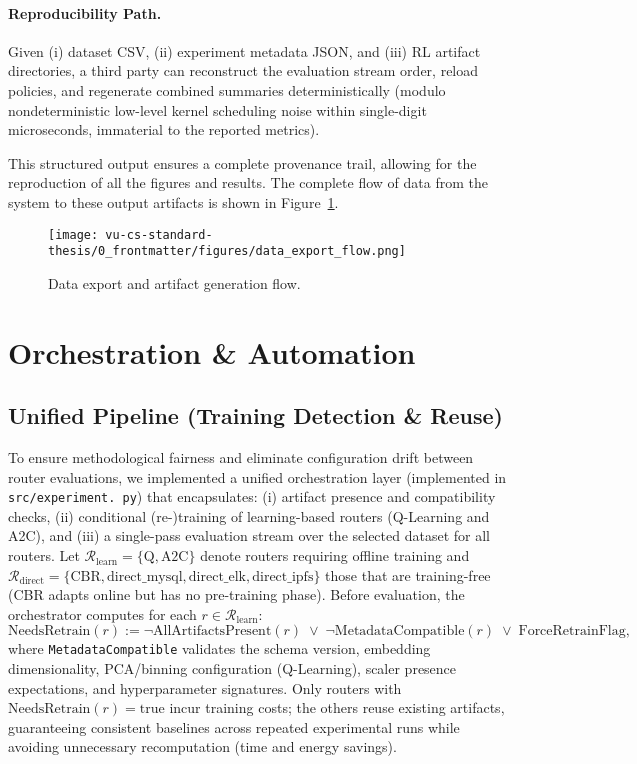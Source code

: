 \paragraph{Reproducibility Path.} Given (i) dataset CSV, (ii) experiment metadata JSON, and (iii) RL artifact directories, a third party can reconstruct the evaluation stream order, reload policies, and regenerate combined summaries deterministically (modulo nondeterministic low-level kernel scheduling noise within single-digit microseconds, immaterial to the reported metrics).

This structured output ensures a complete provenance trail, allowing for the 
reproduction of all the figures and results. The complete flow of data from the 
system to these output artifacts is shown in Figure~\ref{fig:export}.

\begin{figure}[htbp]
\centering
\texttt{[image: vu-cs-standard-thesis/0\_frontmatter/figures/data\_export\_flow.png]}
\caption{Data export and artifact generation flow.}
\label{fig:export}
\end{figure}



\section{Orchestration \& Automation}
\label{s:orchestration}

\subsection{Unified Pipeline (Training Detection \& Reuse)}
\label{s:orchestration-unified-pipeline}
To ensure methodological fairness and eliminate configuration drift between router evaluations, we implemented a unified orchestration layer (implemented in \texttt{src/experiment. py}) that encapsulates: (i) artifact presence  and compatibility checks, (ii) conditional (re-)training of learning-based routers (Q-Learning and A2C), and (iii) a single-pass evaluation stream over the selected dataset for all routers. Let $\mathcal{R}_{\text{learn}} = \{\text{Q}, \text{A2C}\}$ denote routers requiring offline training and $\mathcal{R}_{\text{direct}} = \{\text{CBR}, \text{direct\_mysql}, \text{direct\_elk}, \text{direct\_ipfs}\}$ those that are training-free (CBR adapts online but has no pre-training phase). Before evaluation, the orchestrator computes for each $r \in \mathcal{R}_{\text{learn}}$:
\[
\text{NeedsRetrain}(r) := \neg \text{AllArtifactsPresent}(r) \;\lor\; \neg \text{MetadataCompatible}(r) \;\lor\; \text{ForceRetrainFlag},
\]
where \texttt{MetadataCompatible} validates the schema version, embedding dimensionality, PCA/binning configuration (Q-Learning), scaler presence expectations, and hyperparameter signatures. Only routers with $\text{NeedsRetrain}(r)=\text{true}$ incur training costs; the others reuse existing artifacts, guaranteeing consistent baselines across repeated experimental runs while avoiding unnecessary recomputation (time  and energy savings).

